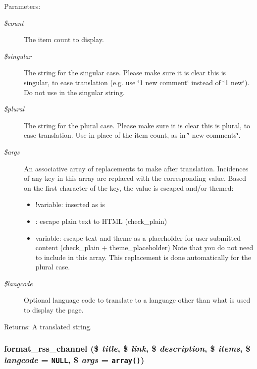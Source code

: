 \begin{Desc}
\item[Parameters:]
\begin{description}
\item[{\em \$count}]The item count to display. \item[{\em \$singular}]The string for the singular case. Please make sure it is clear this is singular, to ease translation (e.g. use \char`\"{}1 new comment\char`\"{} instead of \char`\"{}1 new\char`\"{}). Do not use  in the singular string. \item[{\em \$plural}]The string for the plural case. Please make sure it is clear this is plural, to ease translation. Use  in place of the item count, as in \char`\"{} new comments\char`\"{}. \item[{\em \$args}]An associative array of replacements to make after translation. Incidences of any key in this array are replaced with the corresponding value. Based on the first character of the key, the value is escaped and/or themed:\begin{itemize}
\item !variable: inserted as is\item : escape plain text to HTML (check\_\-plain)\item variable: escape text and theme as a placeholder for user-submitted content (check\_\-plain + theme\_\-placeholder) Note that you do not need to include  in this array. This replacement is done automatically for the plural case. \end{itemize}
\item[{\em \$langcode}]Optional language code to translate to a language other than what is used to display the page. \end{description}
\end{Desc}
\begin{Desc}
\item[Returns:]A translated string. \end{Desc}
\hypertarget{group__format_g44992b971aed4a6a5b8457678f57de50}{
\subsubsection[{format\_\-rss\_\-channel}]{\setlength{\rightskip}{0pt plus 5cm}format\_\-rss\_\-channel (\$ {\em title}, \/  \$ {\em link}, \/  \$ {\em description}, \/  \$ {\em items}, \/  \$ {\em langcode} = {\tt NULL}, \/  \$ {\em args} = {\tt array()})}}
\label{group__format_g44992b971aed4a6a5b8457678f57de50}


